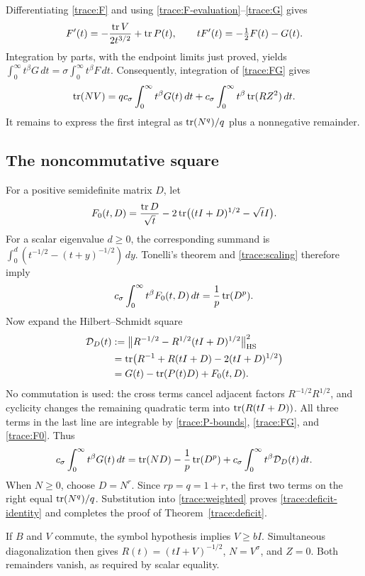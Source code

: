 Differentiating \eqref{trace:F} and using
\eqref{trace:F-evaluation}--\eqref{trace:G} gives
\[
 F'(t)=-\frac{\operatorname{tr} V}{2t^{3/2}}+\operatorname{tr} P(t),
 \qquad tF'(t)=-\tfrac12F(t)-G(t).
\]
Integration by parts, with the endpoint limits just proved, yields
$\int_0^\infty t^\beta G\,dt
 =\sigma\int_0^\infty t^\beta F\,dt$.
Consequently, integration of \eqref{trace:FG} gives
\begin{equation}\label{trace:weighted}
 \operatorname{tr}(NV)=q c_\sigma\int_0^\infty t^\beta G(t)\,dt
       +c_\sigma\int_0^\infty t^\beta\operatorname{tr}(RZ^2)\,dt.
\end{equation}
It remains to express the first integral as $\operatorname{tr}(N^q)/q$ plus
a nonnegative remainder.

\subsection{The noncommutative square}

For a positive semidefinite matrix $D$, let
\[
 F_0(t,D)=\frac{\operatorname{tr} D}{\sqrt t}
       -2\operatorname{tr}\bigl((tI+D)^{1/2}-\sqrt t I\bigr).
\]
For a scalar eigenvalue $d\geq0$, the corresponding summand is
$\int_0^d(t^{-1/2}-(t+y)^{-1/2})\,dy$.
Tonelli's theorem and \eqref{trace:scaling} therefore imply
\begin{equation}\label{trace:F0}
 c_\sigma\int_0^\infty t^\beta F_0(t,D)\,dt
     =\frac1p\operatorname{tr}(D^p).
\end{equation}
Now expand the Hilbert--Schmidt square
\begin{align}
 \mathcal D_D(t)
  &:=\bigl\|R^{-1/2}-R^{1/2}(tI+D)^{1/2}\bigr\|_{\mathrm{HS}}^2
       \notag\\
  &=\operatorname{tr}\bigl(R^{-1}+R(tI+D)-2(tI+D)^{1/2}\bigr)
       \label{trace:square}\\
  &=G(t)-\operatorname{tr}(P(t)D)+F_0(t,D).\notag
\end{align}
No commutation is used: the cross terms cancel adjacent factors
$R^{-1/2}R^{1/2}$, and cyclicity changes the remaining quadratic
term into $\operatorname{tr}(R(tI+D))$.
All three terms in the last line are integrable by
\eqref{trace:P-bounds}, \eqref{trace:FG}, and \eqref{trace:F0}.
Thus
\begin{equation}\label{trace:duality}
 c_\sigma\int_0^\infty t^\beta G(t)\,dt
  =\operatorname{tr}(ND)-\frac1p\operatorname{tr}(D^p)
       +c_\sigma\int_0^\infty t^\beta\mathcal D_D(t)\,dt.
\end{equation}
When $N\geq0$, choose $D=N^r$.  Since $rp=q=1+r$,
the first two terms on the right equal $\operatorname{tr}(N^q)/q$.
Substitution into \eqref{trace:weighted} proves
\eqref{trace:deficit-identity} and completes the proof of
Theorem~\ref{trace:deficit}.

If $B$ and $V$ commute, the symbol hypothesis implies $V\geq bI$.
Simultaneous diagonalization then gives
$R(t)=(tI+V)^{-1/2}$, $N=V^\sigma$, and $Z=0$.
Both remainders vanish, as required by scalar equality.
